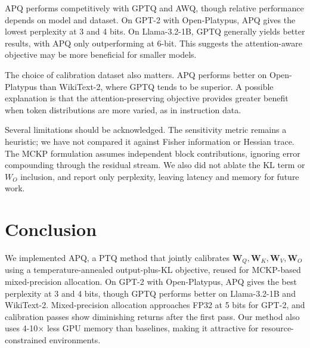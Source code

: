 \documentclass[10pt,twocolumn,letterpaper]{article}
\begin{document}
APQ performs competitively with GPTQ and AWQ, though relative performance depends on model and dataset. On GPT-2 with Open-Platypus, APQ gives the lowest perplexity at 3 and 4 bits. On Llama-3.2-1B, GPTQ generally yields better results, with APQ only outperforming at 6-bit. This suggests the attention-aware objective may be more beneficial for smaller models.

The choice of calibration dataset also matters. APQ performs better on Open-Platypus than WikiText-2, where GPTQ tends to be superior. A possible explanation is that the attention-preserving objective provides greater benefit when token distributions are more varied, as in instruction data.

Several limitations should be acknowledged. The sensitivity metric remains a heuristic; we have not compared it against Fisher information or Hessian trace. The MCKP formulation assumes independent block contributions, ignoring error compounding through the residual stream. We also did not ablate the KL term or $W_O$ inclusion, and report only perplexity, leaving latency and memory for future work.

%

\section{Conclusion}

We implemented APQ, a PTQ method that jointly calibrates $\mathbf{W}_Q,\mathbf{W}_K,\mathbf{W}_V,\mathbf{W}_O$ using a temperature-annealed output-plus-KL objective, reused for MCKP-based mixed-precision allocation. On GPT-2 with Open-Platypus, APQ gives the best perplexity at 3 and 4 bits, though GPTQ performs better on Llama-3.2-1B and WikiText-2. Mixed-precision allocation approaches FP32 at 5 bits for GPT-2, and calibration passes show diminishing returns after the first pass. Our method also uses 4-10$\times$ less GPU memory than baselines, making it attractive for resource-constrained environments.
\end{document}
